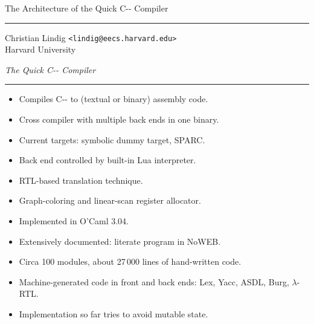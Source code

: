 \documentclass{seminar}
\def\heading#1{\textsf{\textit{#1}}\vskip2pt\hrule\bigskip}
\def\PAL{\hbox{C-{}-}}
\let\C\PAL
\def\rtl{{\small RTL}}
\newenvironment{half}%
    {\begin{minipage}[t]{0.45\hsize}}
    {\end{minipage}}
\begin{document}

\begin{slide}
    \strut\vfill
    {\Large\sf The Architecture of the Quick {\C} Compiler}
    \vspace{0.5ex}\hrule\vspace{4ex}
    {\large\textsf{Christian Lindig} 
           \texttt{<lindig@eecs.harvard.edu>}}\\[2ex]
    {\large\textsf{Harvard University}}\\[3ex]
    \vfill\vfill
\end{slide}


\begin{slide}
    \heading{The Quick {\C} Compiler}
    \begin{half}
        \begin{itemize}
        \item Compiles {\PAL} to (textual or binary) assembly code.
        \item Cross compiler with multiple back ends in one binary.
        \item Current targets: symbolic dummy target, {\small SPARC}.
        \item Back end controlled by built-in Lua interpreter.
        \item {\rtl}-based translation technique.
        \item Graph-coloring and linear-scan register allocator.
        \end{itemize}
    \end{half}
    \hfil
    \begin{half}
        \begin{itemize}
        \item Implemented in O'Caml 3.04.
        \item Extensively documented: literate program in NoWEB.
        \item Circa 100 modules, about 27\,000 lines of hand-written
              code.
        \item Machine-generated code in front and back ends: Lex, Yacc,
              {\small ASDL}, Burg, $\lambda$-{\rtl}.
        \item Implementation so far tries to avoid mutable state.
        \end{itemize}
    \end{half}
\end{slide}
\end{document}
